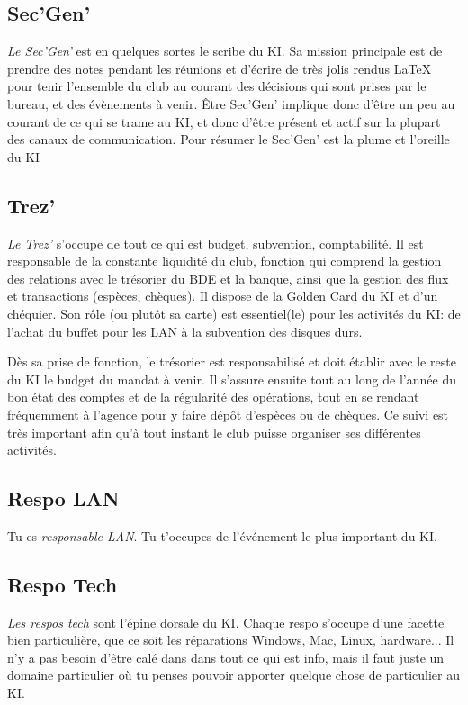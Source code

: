 \documentclass{ki019}
\begin{document}
\subsection{Sec'Gen'}

\emph{Le Sec’Gen’} est en quelques sortes le scribe du KI. Sa mission principale est de prendre des notes pendant les réunions et d’écrire de très jolis rendus LaTeX pour tenir l’ensemble du club au courant des décisions qui sont prises par le bureau, et des évènements à venir. Être Sec’Gen’ implique donc d’être un peu au courant de ce qui se trame au KI, et donc d’être présent et actif sur la plupart des canaux de communication. Pour résumer le Sec’Gen’ est la plume et l’oreille du KI

\subsection{Trez'}

\emph{Le Trez’} s’occupe de tout ce qui est budget, subvention, comptabilité. Il est responsable de la constante liquidité du club, fonction qui comprend la gestion des relations avec le trésorier du BDE et la banque, ainsi que la gestion des flux et transactions (espèces, chèques). Il dispose de la Golden Card du KI et d’un chéquier. Son rôle (ou plutôt sa carte) est essentiel(le) pour les activités du KI: de l’achat du buffet pour les LAN à la subvention des disques durs.

Dès sa prise de fonction, le trésorier est responsabilisé et doit établir avec le reste du KI le budget du mandat à venir. Il s’assure ensuite tout au long de l’année du bon état des comptes et de la régularité des opérations, tout en se rendant fréquemment à l’agence pour y faire dépôt d’espèces ou de chèques. Ce suivi est très important afin qu’à tout instant le club puisse organiser ses différentes activités.


\subsection{Respo LAN}

Tu es \emph{responsable LAN}. Tu t’occupes de l’événement le plus important du KI.

\subsection{Respo Tech}

\emph{Les respos tech} sont l’épine dorsale du KI. Chaque respo s’occupe d’une facette bien particulière, que ce soit les réparations Windows, Mac, Linux, hardware... Il n’y a pas besoin d’être calé dans dans tout ce qui est info, mais il faut juste un domaine particulier où tu penses pouvoir apporter quelque chose de particulier au KI.
\end{document}
